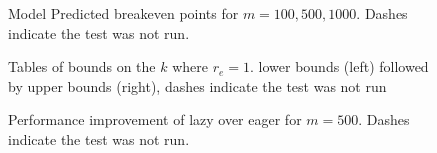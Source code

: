 \begin{figure}
\centering

\caption{Model Predicted breakeven points for $m=100,500,1000$. Dashes indicate the test was not run.}
\label{table:keven}
\end{figure}

\begin{figure}
\centering

\caption{Tables of bounds on the $k$ where $r_e=1$. lower bounds (left) followed by upper bounds (right), dashes indicate the test was not run}
\label{table:bounds}
\end{figure}

\begin{figure}
\centering

\caption{Performance improvement of lazy over eager for $m=500$. Dashes indicate the test was not run.}
\label{table:sle}
\end{figure}
